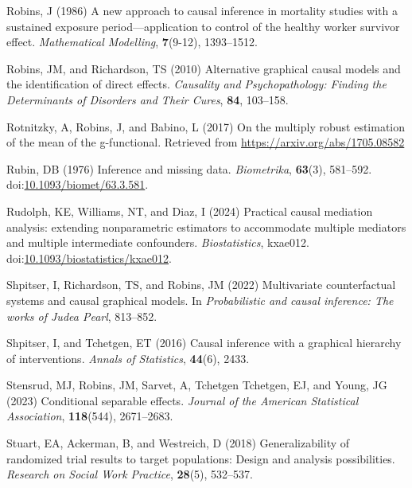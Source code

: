 \documentclass[
  single column]{article}
\newlength{\cslhangindent}
\newenvironment{CSLReferences}[2] %
 {\begin{list}{}{%
  \setlength{\itemindent}{0pt}
  \setlength{\leftmargin}{0pt}
  \setlength{\parsep}{0pt}
  \ifodd #1
   \setlength{\leftmargin}{\cslhangindent}
   \setlength{\itemindent}{-1\cslhangindent}
  \fi
  \setlength{\itemsep}{#2\baselineskip}}}
 {\end{list}}
\begin{document}
\begin{CSLReferences}{1}{0}
Robins, J (1986) A new approach to causal inference in mortality studies
with a sustained exposure period---application to control of the healthy
worker survivor effect. \emph{Mathematical Modelling}, \textbf{7}(9-12),
1393--1512.

Robins, JM, and Richardson, TS (2010) Alternative graphical causal
models and the identification of direct effects. \emph{Causality and
Psychopathology: Finding the Determinants of Disorders and Their Cures},
\textbf{84}, 103--158.

Rotnitzky, A, Robins, J, and Babino, L (2017) On the multiply robust
estimation of the mean of the g-functional. Retrieved from
\url{https://arxiv.org/abs/1705.08582}

Rubin, DB (1976) Inference and missing data. \emph{Biometrika},
\textbf{63}(3), 581--592.
doi:\href{https://doi.org/10.1093/biomet/63.3.581}{10.1093/biomet/63.3.581}.

Rudolph, KE, Williams, NT, and Diaz, I (2024) {Practical causal
mediation analysis: extending nonparametric estimators to accommodate
multiple mediators and multiple intermediate confounders}.
\emph{Biostatistics}, kxae012.
doi:\href{https://doi.org/10.1093/biostatistics/kxae012}{10.1093/biostatistics/kxae012}.

Shpitser, I, Richardson, TS, and Robins, JM (2022) Multivariate
counterfactual systems and causal graphical models. In
\emph{Probabilistic and causal inference: The works of {J}udea {P}earl},
813--852.

Shpitser, I, and Tchetgen, ET (2016) Causal inference with a graphical
hierarchy of interventions. \emph{Annals of Statistics}, \textbf{44}(6),
2433.

Stensrud, MJ, Robins, JM, Sarvet, A, Tchetgen Tchetgen, EJ, and Young,
JG (2023) Conditional separable effects. \emph{Journal of the American
Statistical Association}, \textbf{118}(544), 2671--2683.

Stuart, EA, Ackerman, B, and Westreich, D (2018) Generalizability of
randomized trial results to target populations: Design and analysis
possibilities. \emph{Research on Social Work Practice}, \textbf{28}(5),
532--537.


\end{CSLReferences}
\end{document}
